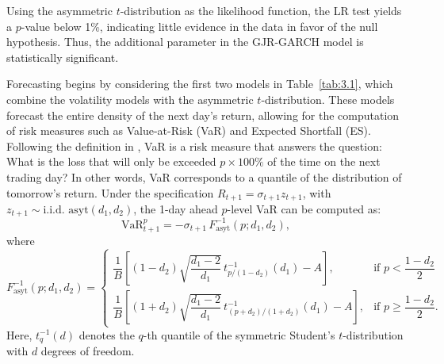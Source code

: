 Using the asymmetric $t$-distribution as the likelihood function, the LR test yields a $p$-value below 1\%, indicating little evidence in the data in favor of the null hypothesis. Thus, the additional parameter in the GJR-GARCH model is statistically significant.

Forecasting begins by considering the first two models in Table~\ref{tab:3.1}, which combine the volatility models with the asymmetric $t$-distribution. These models forecast the entire density of the next day’s return, allowing for the computation of risk measures such as Value-at-Risk (VaR) and Expected Shortfall (ES). Following the definition in , VaR is a risk measure that answers the question: What is the loss that will only be exceeded $p \times 100\%$ of the time on the next trading day? In other words, VaR corresponds to a quantile of the distribution of tomorrow’s return.
\newpage
Under the specification $R_{t+1} = \sigma_{t+1} z_{t+1}$, with $z_{t+1} \sim \text{i.i.d. asyt}(d_1, d_2)$, the 1-day ahead $p$-level VaR can be computed as:
\begin{equation}
\text{VaR}_{t+1}^p = -\sigma_{t+1} \, F^{-1}_{\text{asyt}}(p; d_1, d_2),
\label{eq:4.3}
\end{equation}
where
\[
F^{-1}_{\text{asyt}}(p; d_1, d_2) =
\begin{cases}
\dfrac{1}{B} \left[(1 - d_2) \sqrt{\dfrac{d_1 - 2}{d_1}} \, t^{-1}_{p/(1 - d_2)}(d_1) - A \right], & \text{if } p < \dfrac{1 - d_2}{2} \\
\dfrac{1}{B} \left[(1 + d_2) \sqrt{\dfrac{d_1 - 2}{d_1}} \, t^{-1}_{(p + d_2)/(1 + d_2)}(d_1) - A \right], & \text{if } p \geq \dfrac{1 - d_2}{2}.
\end{cases}
\]
Here, $t^{-1}_{q}(d)$ denotes the $q$-th quantile of the symmetric Student's $t$-distribution with $d$ degrees of freedom.

